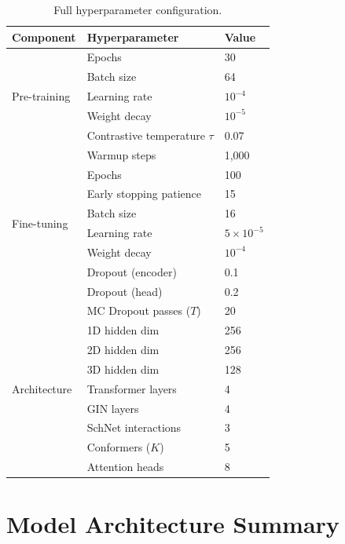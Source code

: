 \documentclass[11pt]{article}
\begin{document}
\begin{table}[h]
    \centering
    \caption{Full hyperparameter configuration.}
    \small
    \begin{tabular}{lll}
        \toprule
        \textbf{Component} & \textbf{Hyperparameter} & \textbf{Value} \\
        \midrule
        \multirow{5}{*}{Pre-training} & Epochs & 30 \\
        & Batch size & 64 \\
        & Learning rate & $10^{-4}$ \\
        & Weight decay & $10^{-5}$ \\
        & Contrastive temperature $\tau$ & 0.07 \\
        & Warmup steps & 1,000 \\
        \midrule
        \multirow{6}{*}{Fine-tuning} & Epochs & 100 \\
        & Early stopping patience & 15 \\
        & Batch size & 16 \\
        & Learning rate & $5 \times 10^{-5}$ \\
        & Weight decay & $10^{-4}$ \\
        & Dropout (encoder) & 0.1 \\
        & Dropout (head) & 0.2 \\
        & MC Dropout passes ($T$) & 20 \\
        \midrule
        \multirow{7}{*}{Architecture} & 1D hidden dim & 256 \\
        & 2D hidden dim & 256 \\
        & 3D hidden dim & 128 \\
        & Transformer layers & 4 \\
        & GIN layers & 4 \\
        & SchNet interactions & 3 \\
        & Conformers ($K$) & 5 \\
        & Attention heads & 8 \\
        \bottomrule
    \end{tabular}
\end{table}

\section{Model Architecture Summary}
\label{app:architecture}
\end{document}

